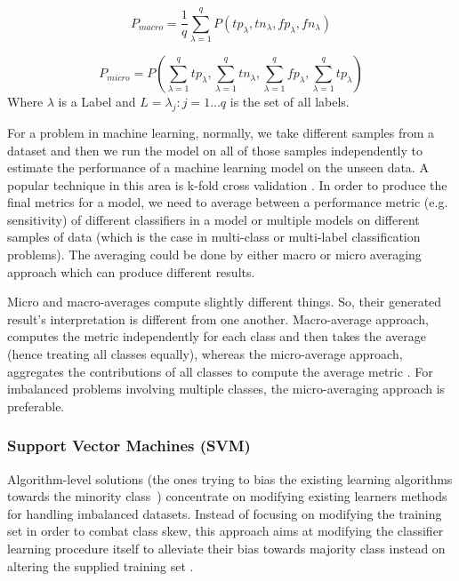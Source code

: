 \begin{equation}
    P_{macro} = \frac{1}{q} \sum_{\lambda =1}^{q} P(tp_{\lambda},tn_{\lambda},fp_{\lambda},fn_{\lambda})
    \label{eq:macro}
\end{equation}

\begin{equation}
    P_{micro} = P (\sum_{\lambda =1}^{q}tp_{\lambda}, \sum_{\lambda =1}^{q}tn_{\lambda}, \sum_{\lambda =1}^{q}fp_{\lambda}, \sum_{\lambda =1}^{q}tp_{\lambda})
    \label{eq:micro}
\end{equation}
Where $\lambda$ is a Label and $L = {\lambda_{j}: j= 1...q}$ is the set of all labels.

For a problem in machine learning, normally, we take different samples from a dataset and then 
we run the model on all of those samples independently to estimate the performance of a machine learning 
model on the unseen data. A popular technique in this area is k-fold cross validation 
\cite{james_introduction_2013}. In order to produce the final metrics for a model, we need 
to average between a performance metric (e.g. sensitivity) of different classifiers in 
a model or multiple models on different samples of data (which is the case in multi-class 
or multi-label classification problems). The averaging could be done by either macro or 
micro averaging approach which can produce different results.

Micro and macro-averages compute slightly different things. So, their generated result's interpretation is 
different from one another. Macro-average approach, computes the metric independently for each class 
and then takes the average (hence treating all classes equally), whereas the micro-average approach, 
aggregates the contributions of all classes to compute the average metric \cite{sokolova_systematic_2009}. 
For imbalanced problems involving multiple classes, the micro-averaging approach is preferable.


\subsubsection{Support Vector Machines (SVM)}
Algorithm-level solutions (the ones trying to bias the existing learning algorithms towards 
the minority class~\cite{lin_support_2002}) concentrate on modifying existing learners 
methods for handling 
imbalanced datasets. Instead of focusing on modifying the training set in order to combat 
class skew, this approach aims at modifying the classifier learning procedure itself to 
alleviate their bias towards majority class instead on altering the supplied 
training set \cite{krawczyk2016learning}.

